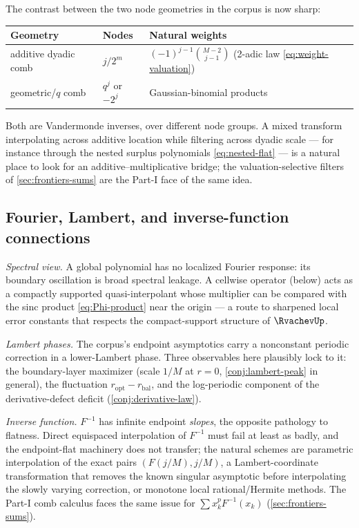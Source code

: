 The contrast between the two node geometries in the corpus is now
sharp:
\begin{center}
\small
\begin{tabular}{@{}lll@{}}
\toprule
Geometry & Nodes & Natural weights\\
\midrule
additive dyadic comb & $j/2^{m}$ & $(-1)^{j-1}\binom{M-2}{j-1}$
(2-adic law \eqref{eq:weight-valuation})\\
geometric/$q$ comb & $q^{j}$ or $-2^{j}$ & Gaussian-binomial products\\
\bottomrule
\end{tabular}
\end{center}
Both are Vandermonde inverses, over different node groups.  A mixed
transform interpolating across additive location while filtering
across dyadic scale --- for instance through the nested surplus
polynomials \eqref{eq:nested-flat} --- is a natural place to look for
an additive--multiplicative bridge; the valuation-selective filters of
\cref{sec:frontiers-sums} are the Part-I face of the same idea.

\subsection{Fourier, Lambert, and inverse-function connections}

\emph{Spectral view.}  A global polynomial has no localized Fourier
response: its boundary oscillation is broad spectral leakage.  A
cellwise operator (below) acts as a compactly supported
quasi-interpolant whose multiplier can be compared with the sinc
product \eqref{eq:Phi-product} near the origin --- a route to
sharpened local error constants that respects the compact-support
structure of $\RvachevUp$.

\emph{Lambert phases.}  The corpus's endpoint asymptotics carry a
nonconstant periodic correction in a lower-Lambert phase.  Three
observables here plausibly lock to it: the boundary-layer maximizer
(scale $1/M$ at $r=0$, \cref{conj:lambert-peak} in general), the
fluctuation $r_{\mathrm{opt}}-r_{\mathrm{bal}}$, and the log-periodic
component of the derivative-defect deficit
(\cref{conj:derivative-law}).

\emph{Inverse function.}  $F^{-1}$ has infinite endpoint
\emph{slopes}, the opposite pathology to flatness.  Direct equispaced
interpolation of $F^{-1}$ must fail at least as badly, and the
endpoint-flat machinery does not transfer; the natural schemes are
parametric interpolation of the exact pairs $(F(j/M),j/M)$, a
Lambert-coordinate transformation that removes the known singular
asymptotic before interpolating the slowly varying correction, or
monotone local rational/Hermite methods.  The Part-I comb calculus
faces the same issue for $\sum x_k^{p}F^{-1}(x_k)$
(\cref{sec:frontiers-sums}).

